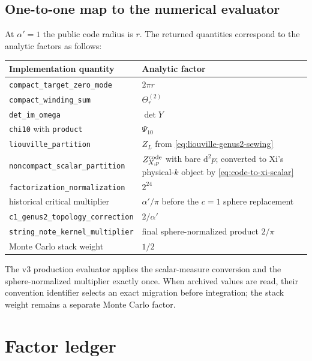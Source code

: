 \documentclass[11pt]{article}
\numberwithin{equation}{section}
\newcommand{\A}{\alpha'}
\newcommand{\dd}{\mathrm d}
\begin{document}
\subsection{One-to-one map to the numerical evaluator}

At $\A=1$ the public code radius is $r$.  The returned quantities correspond
to the analytic factors as follows:
\begin{center}
\begin{tabular}{@{}p{}p{}@{}}
\toprule
Implementation quantity & Analytic factor \\
\midrule
\texttt{compact\_target\_zero\_mode} & $2\pi r$ \\
\texttt{compact\_winding\_sum} & $\Theta_r^{(2)}$ \\
\texttt{det\_im\_omega} & $\det Y$ \\
\texttt{chi10} with \texttt{product} & $\Psi_{10}$ \\
\texttt{liouville\_partition} & $Z_L$ from \eqref{eq:liouville-genus2-sewing} \\
\texttt{noncompact\_scalar\_partition} & $Z_{X,p}^{\rm code}$ with bare $\dd^2p$; converted to Xi's physical-$k$ object by \eqref{eq:code-to-xi-scalar} \\
\texttt{factorization\_normalization} & $2^{24}$ \\
historical critical multiplier & $\A/\pi$ before the $c=1$ sphere replacement \\
\texttt{c1\_genus2\_topology\_correction} & $2/\A$ \\
\texttt{string\_note\_kernel\_multiplier} & final sphere-normalized product $2/\pi$ \\
Monte Carlo stack weight & $1/2$ \\
\bottomrule
\end{tabular}
\end{center}
The v3 production evaluator applies the scalar-measure conversion and the
sphere-normalized multiplier exactly once.  When archived values are read,
their convention identifier selects an exact migration before integration;
the stack weight remains a separate Monte Carlo factor.


\section{Factor ledger}
\end{document}
